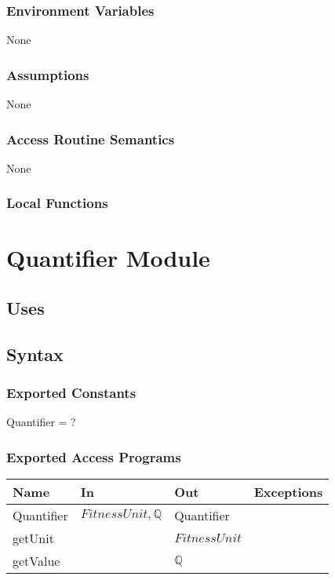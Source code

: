 \documentclass[12pt, titlepage]{article}
\begin{document}
\subsubsection{Environment Variables}
None

\subsubsection{Assumptions}
None

\subsubsection{Access Routine Semantics}

None

\subsubsection{Local Functions}


\newpage

\section{Quantifier Module}

\subsection{Uses}

\subsection{Syntax}

\subsubsection{Exported Constants}
Quantifier = ?
\subsubsection{Exported Access Programs}

\begin{center}
	\begin{tabular}{p{2cm} p{4cm} p{4cm} p{2cm}}
		\hline
		\textbf{Name} & \textbf{In} & \textbf{Out} & \textbf{Exceptions} \\
		\hline
		Quantifier & $FitnessUnit, \mathbb{Q}$ & Quantifier &  \\
		getUnit &  & $FitnessUnit$ &  \\
		getValue &  & $\mathbb{Q}$ &  \\
		\hline
	\end{tabular}
\end{center}
\end{document}

